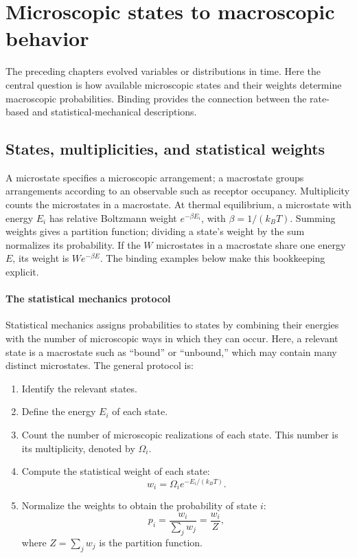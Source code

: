 \clearpage
\section{Microscopic states to macroscopic behavior}
\label{sec:states}
The preceding chapters evolved variables or distributions in time.
Here the central question is how available microscopic states and their weights determine macroscopic probabilities.
Binding provides the connection between the rate-based and statistical-mechanical descriptions.
\subsection{States, multiplicities, and statistical weights}
\label{sec:state-weights}
A microstate specifies a microscopic arrangement; a macrostate groups arrangements according to an observable such as receptor occupancy.
Multiplicity counts the microstates in a macrostate.
At thermal equilibrium, a microstate with energy $E_i$ has relative Boltzmann weight $e^{-\beta E_i}$, with $\beta=1/(k_BT)$.
Summing weights gives a partition function; dividing a state's weight by the sum normalizes its probability.
If the $W$ microstates in a macrostate share one energy $E$, its weight is $We^{-\beta E}$.
The binding examples below make this bookkeeping explicit.

\paragraph{The statistical mechanics protocol}
Statistical mechanics assigns probabilities to states by combining their energies with the number of microscopic ways in which they can occur.
Here, a relevant state is a macrostate such as ``bound'' or ``unbound,'' which may contain many distinct microstates.
The general protocol is:

\begin{enumerate}
    \item Identify the relevant states.
    \item Define the energy $E_i$ of each state.
    \item Count the number of microscopic realizations of each state.
    This number is its multiplicity, denoted by $\Omega_i$.
    \item Compute the statistical weight of each state:
    \[
        w_i=\Omega_i e^{-E_i/(k_BT)}.
    \]
    \item Normalize the weights to obtain the probability of state $i$:
    \[
        p_i=\frac{w_i}{\sum_j w_j}=\frac{w_i}{Z},
    \]
    where $Z=\sum_jw_j$ is the partition function.
\end{enumerate}


